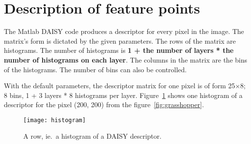 \section{Description of feature points}

The Matlab DAISY code produces a descriptor for every pixel in the image. The
matrix's form is dictated by the given parameters. The rows of the matrix are
histograms. The number of histograms is \textbf{1 + the number of layers * the
number of histograms on each layer}. The columns in the matrix are the bins of
the histograms. The number of bins can also be controlled.

With the default parameters, the descriptor matrix for one pixel is of form
25$\times$8; 8 bins, 1 + 3 layers * 8 histograms per layer.
Figure~\ref{fig:histogram} shows one histogram of a descriptor for the pixel
(200, 200) from the figure~\ref{fig:grasshopper}.

\begin{figure}\label{fig:histogram}
  \texttt{[image: histogram]}
  \caption{A row, ie.\ a histogram of a DAISY descriptor.}
\end{figure}

